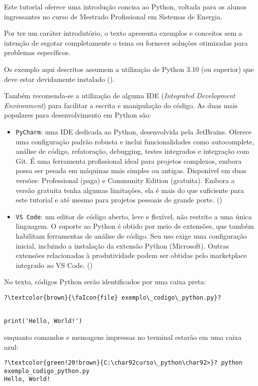 
Este tutorial oferece uma introdução concisa ao Python, voltada para os alunos ingressantes no curso de Mestrado
Profissional em Sistemas de Energia.

Por ter um caráter introdutório, o texto apresenta exemplos e conceitos sem a intenção de esgotar completamente o
tema ou fornecer soluções otimizadas para problemas específicos.

Os exemplo aqui descritos assumem a utilização de Python 3.10 (ou superior) que deve estar devidamente instalado ().

Também recomenda-se a utilização de alguma IDE (\emph{Integrated Development Environment}) para facilitar a escrita e manipulação do código.
As duas mais populares para desenvolvimento em Python são:
\begin{itemize}
    \item \texttt{PyCharm}: uma IDE dedicada ao Python, desenvolvida pela JetBrains.
    Oferece uma configuração padrão robusta e inclui funcionalidades como autocomplete, análise de código, refatoração,
    debugging, testes integrados e integração com Git.
    É uma ferramenta profissional ideal para projetos complexos, embora possa ser pesada em máquinas mais simples ou antigas.
    Disponível em duas versões: Professional (paga) e Community Edition (gratuita).
    Embora a versão gratuita tenha algumas limitações, ela é mais do que suficiente para este tutorial e até mesmo para projetos pessoais de grande porte.
    ()
    \item \texttt{VS Code}: um editor de código aberto, leve e flexível, não restrito a uma única linguagem.
    O suporte ao Python é obtido por meio de extensões, que também habilitam ferramentas de análise de código.
    Seu uso exige uma configuração inicial, incluindo a instalação da extensão Python (Microsoft).
    Outras extensões relacionadas à produtividade podem ser obtidas pelo marketplace integrado ao VS Code.
    ()
\end{itemize}


No texto, códigos Python serão identificados por uma caixa preta:
\begin{verbatim}
?\textcolor{brown}{\faIcon{file} exemplo\_codigo\_python.py}?
\end{verbatim}
\vspace{-0.8em}
%
\begin{verbatim}

print('Hello, World!')
\end{verbatim}

enquanto comandos e mensagens impressas no terminal estarão em uma caixa azul:
\begin{verbatim}
?\textcolor{green!20!brown}{C:\char92curso\_python\char92>}? python exemplo_codigo_python.py
Hello, World!
\end{verbatim}